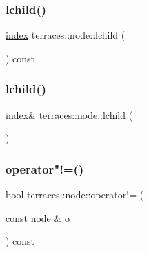 \subsubsection{\texorpdfstring{lchild()}{lchild()}\hspace{0.1cm}{\footnotesize\ttfamily [1/2]}}
{\footnotesize\ttfamily \hyperlink{namespaceterraces_adbc33ccb543d1634e96d0eb02e472c77}{index} terraces\+::node\+::lchild (\begin{DoxyParamCaption}{ }\end{DoxyParamCaption}) const\hspace{0.3cm}{\ttfamily [inline]}}

\mbox{\label{structterraces_1_1node_a4df948704080a44771de4909dd94699a}} 
\subsubsection{\texorpdfstring{lchild()}{lchild()}\hspace{0.1cm}{\footnotesize\ttfamily [2/2]}}
{\footnotesize\ttfamily \hyperlink{namespaceterraces_adbc33ccb543d1634e96d0eb02e472c77}{index}\& terraces\+::node\+::lchild (\begin{DoxyParamCaption}{ }\end{DoxyParamCaption})\hspace{0.3cm}{\ttfamily [inline]}}

\mbox{\label{structterraces_1_1node_aebef4e5aff81c490f0fa4ee5ef146484}} 
\subsubsection{\texorpdfstring{operator"!=()}{operator!=()}}
{\footnotesize\ttfamily bool terraces\+::node\+::operator!= (\begin{DoxyParamCaption}\item[{const \hyperlink{structterraces_1_1node}{node} \&}]{o }\end{DoxyParamCaption}) const\hspace{0.3cm}{\ttfamily [inline]}}

\mbox{\label{structterraces_1_1node_ad0776c1f5b296a8cf52925b4e497814a}} 
